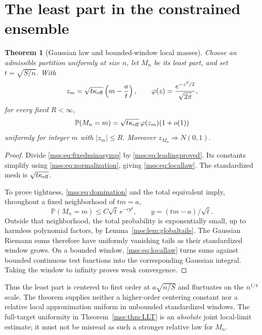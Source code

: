 \documentclass[11pt,letterpaper]{article}
\numberwithin{equation}{section}
\newtheorem{theorem}{Theorem}[section]
\theoremstyle{definition}\newtheorem{definition}[theorem]{Definition}
\theoremstyle{remark}\newtheorem{remark}[theorem]{Remark}
\newcommand{\Prob}{\mathbb P}
\newcommand{\phis}{\varphi}
\begin{document}
\section{The least part in the constrained ensemble}\label{mss:sec:least}
\begin{theorem}[Gaussian law and bounded-window local masses]\label{mss:thm:clt}
Choose an admissible partition uniformly at size $n$, let $M_n$ be its least part, and set $t=\sqrt{S/n}$. With
\begin{equation}\label{mss:eq:zm}
z_m=\sqrt{t\kappa_{\rm eff}}\left(m-\frac a t\right),
\qquad \phis(z)=\frac{e^{-z^2/2}}{\sqrt{2\pi}},
\end{equation}
for every fixed $R<\infty$,
\begin{equation}\label{mss:eq:locallaw}
\Prob(M_n=m)=\sqrt{t\kappa_{\rm eff}}\,\phis(z_m)(1+o(1))
\end{equation}
uniformly for integer $m$ with $|z_m|\le R$. Moreover $z_{M_n}\Longrightarrow N(0,1)$.
\end{theorem}
\begin{proof}
Divide \eqref{mss:eq:fixedminasymp} by \eqref{mss:eq:leadingproved}. Its constants simplify using \eqref{mss:eq:normalization}, giving \eqref{mss:eq:locallaw}. The standardized mesh is $\sqrt{t\kappa_{\rm eff}}$.

To prove tightness, \eqref{mss:eq:domination} and the total equivalent imply, throughout a fixed neighborhood of $tm=a$,
\[
\Prob(M_n=m)\le C\sqrt t\,e^{-cy^2},\qquad y=(tm-a)/\sqrt t.
\]
Outside that neighborhood, the total probability is exponentially small, up to harmless polynomial factors, by Lemma~\ref{mss:lem:globaltails}. The Gaussian Riemann sums therefore have uniformly vanishing tails as their standardized window grows. On a bounded window, \eqref{mss:eq:locallaw} turns sums against bounded continuous test functions into the corresponding Gaussian integral. Taking the window to infinity proves weak convergence.
\end{proof}
Thus the least part is centered to first order at $a\sqrt{n/S}$ and fluctuates on the $n^{1/4}$ scale. The theorem supplies neither a higher-order centering constant nor a relative local approximation uniform in unbounded standardized windows. The full-target uniformity in Theorem~\ref{mss:thm:LLT} is an \emph{absolute} joint local-limit estimate; it must not be misread as such a stronger relative law for $M_n$.
\end{document}
